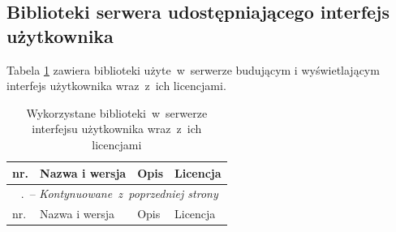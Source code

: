 \documentclass[a4paper,11pt,twoside]{report}
\renewcommand*{\thetable}{\arabic{chapter}.\arabic{table}}
\theoremstyle{definition}
\begin{document}
        \subsection{Biblioteki serwera udostępniającego interfejs użytkownika}
        Tabela \ref{biblioteki-frontend} zawiera biblioteki użyte~w~serwerze budującym i wyświetlającym interfejs użytkownika wraz~z~ich licencjami.
        
        \begin{longtable}{| p{} | p{} | p{} | p{} |}
            \caption{Wykorzystane biblioteki~w~serwerze interfejsu użytkownika wraz~z~ich licencjami}
            \label{biblioteki-frontend} \\
            \hline
            nr. & Nazwa i wersja & Opis & Licencja \\ \hline
            \endfirsthead
            \multicolumn{4}{c}{\tablename\ \thetable\ -- \textit{Kontynuowane~z~poprzedniej strony}} \\
            \hline
            nr. & Nazwa i wersja & Opis & Licencja \\ \hline
            \endhead
            

\end{longtable}
\end{document}

